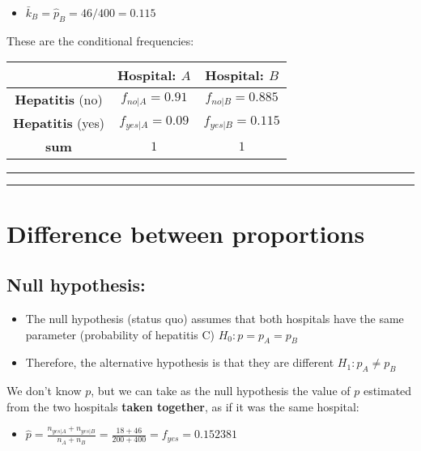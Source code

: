 \documentclass[
]{book}
\providecommand{\tightlist}{%
  \setlength{\itemsep}{0pt}\setlength{\parskip}{0pt}}
\begin{document}
\begin{itemize}
\tightlist
\item
  \(\bar{k}_B=\hat{p}_B=46/400=0.115\)
\end{itemize}

These are the conditional frequencies:

\begin{longtable}[]{@{}ccc@{}}
\toprule
& Hospital: \(A\) & Hospital: \(B\) \\
\midrule
\endhead
\textbf{Hepatitis} (no) & \(f_{no|A}=0.91\) & \(f_{no|B}=0.885\) \\
\textbf{Hepatitis} (yes) & \(f_{yes|A}=0.09\) & \(f_{yes|B}=0.115\) \\
\textbf{sum} & \(1\) & \(1\) \\
\bottomrule
\end{longtable}

\begin{center}\rule{0.5\linewidth}{0.5pt}\end{center}

\begin{center}\rule{0.5\linewidth}{0.5pt}\end{center}

\hypertarget{difference-between-proportions-4}{%
\section{Difference between proportions}\label{difference-between-proportions-4}}

\hypertarget{null-hypothesis-2}{%
\subsection{Null hypothesis:}\label{null-hypothesis-2}}

\begin{itemize}
\item
  The null hypothesis (status quo) assumes that both hospitals have the same parameter (probability of hepatitis C) \(H_0: p=p_A=p_B\)
\item
  Therefore, the alternative hypothesis is that they are different \(H_1: p_A\neq p_B\)
\end{itemize}

We don't know \(p\), but we can take as the null hypothesis the value of \(p\) estimated from the two hospitals \textbf{taken together}, as if it was the same hospital:

\begin{itemize}
\tightlist
\item
  \(\hat{p}=\frac{n_{yes|A}+n_{yes|B}}{n_A+n_B}=\frac{18+46}{200+400}= f_{yes}=0.152381\)
\end{itemize}
\end{document}
